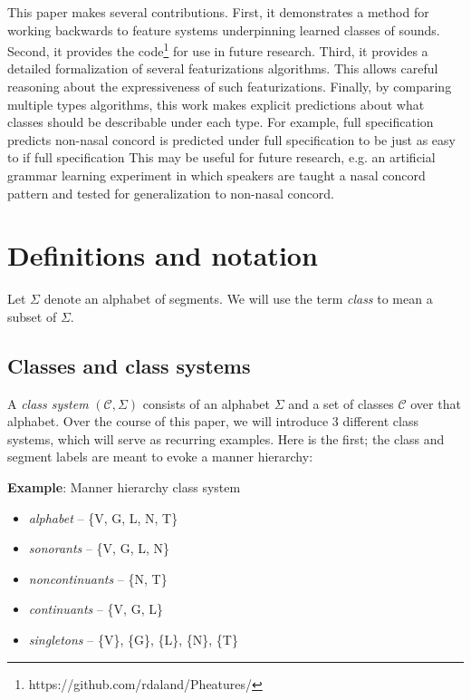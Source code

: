 \documentclass[11pt, oneside]{article}   	%
\begin{document}
This paper makes several contributions. First, it demonstrates a method for working backwards to feature systems underpinning learned classes of sounds. Second, it provides the code\footnote{https://github.com/rdaland/Pheatures/} for use in future research. Third, it provides a detailed formalization of several featurizations algorithms. This allows careful reasoning about the expressiveness of such featurizations. Finally, by comparing multiple types algorithms, this work makes explicit predictions about what classes should be describable under each type. For example, full specification predicts non-nasal concord is predicted under full specification  to be just as easy to  if  full specification This may be useful for future research, e.g. an artificial grammar learning experiment in which speakers are taught a nasal concord pattern and tested for generalization to non-nasal concord.

\section{Definitions and notation}

Let $\Sigma$ denote an alphabet of segments. We will use the term \textit{class} to mean a subset of $\Sigma$.

\subsection{Classes and class systems}

A \textit{class system} $(\mathcal C, \Sigma)$ consists of an alphabet $\Sigma$ and a set of classes $\mathcal C$ over that alphabet. Over the course of this paper, we will introduce 3 different class systems, which will serve as recurring examples. Here is the first; the class and segment labels are meant to evoke a manner hierarchy:

\vspace{\baselineskip} \noindent \textbf{Example}: Manner hierarchy class system \begin{itemize}
  \item \textit{alphabet} -- \{V, G, L, N, T\}
  \item \textit{sonorants} -- \{V, G, L, N\}
  \item \textit{noncontinuants} -- \{N, T\}
  \item \textit{continuants} -- \{V, G, L\}
  \item \textit{singletons} -- \{V\}, \{G\}, \{L\}, \{N\}, \{T\}
  \end{itemize}
\end{document}
